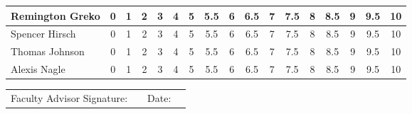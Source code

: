 \documentclass[12pt]{article}
\begin{document}
\begin{center}

  \begin{tabular}{||p{4cm}|c|c|c|c|c|c|c|c|c|c|c|c|c|c|c|c||}
    \hline
    \hline
    Remington Greko & 0 &  1 & 2 & 3 & 4 & 5 & 5.5 & 6 & 6.5 & 7 & 7.5 & 8 & 8.5 & 9 & 9.5 & 10\\
    \hline
    Spencer Hirsch & 0 &  1 & 2 & 3 & 4 & 5 & 5.5 & 6 & 6.5 & 7 & 7.5 & 8 & 8.5 & 9 & 9.5 & 10\\
    \hline
    Thomas Johnson & 0 &  1 & 2 & 3 & 4 & 5 & 5.5 & 6 & 6.5 & 7 & 7.5 & 8 & 8.5 & 9 & 9.5 & 10\\
    \hline
    Alexis Nagle & 0 &  1 & 2 & 3 & 4 & 5 & 5.5 & 6 & 6.5 & 7 & 7.5 & 8 & 8.5 & 9 & 9.5 & 10\\
    \hline
    \hline
    \end{tabular}
\end{center}


\begin{center}
\begin{tabular}{@{}p{1.9in}p{3in}p{.3in}p{1in}@{}}
  Faculty Advisor Signature: & \hrulefill & Date: & \hrulefill\\
\end{tabular}
\end{center}
\end{document}

